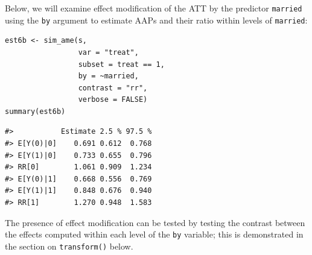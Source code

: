 Below, we will examine effect modification of the ATT by the predictor \texttt{married} using the \texttt{by} argument to estimate AAPs and their ratio within levels of \texttt{married}:
\begin{verbatim}
est6b <- sim_ame(s,
                 var = "treat",
                 subset = treat == 1,
                 by = ~married,
                 contrast = "rr",
                 verbose = FALSE)
summary(est6b)
\end{verbatim}
\begin{verbatim}
#>           Estimate 2.5 % 97.5 %
#> E[Y(0)|0]    0.691 0.612  0.768
#> E[Y(1)|0]    0.733 0.655  0.796
#> RR[0]        1.061 0.909  1.234
#> E[Y(0)|1]    0.668 0.556  0.769
#> E[Y(1)|1]    0.848 0.676  0.940
#> RR[1]        1.270 0.948  1.583
\end{verbatim}
The presence of effect modification can be tested by testing the contrast between the effects computed within each level of the \texttt{by} variable; this is demonstrated in the section on \texttt{transform()} below.
